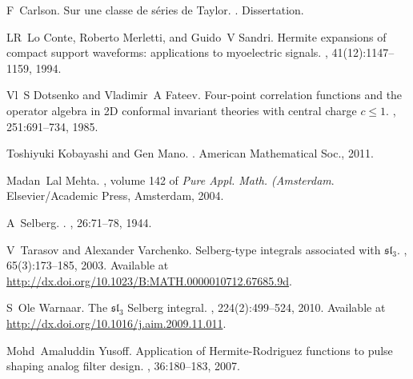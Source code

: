 	
	\nocite{Selberg:411367}
	\nocite{warnaar2010sl3}
	\nocite{dotsenko1985four}
	\nocite{tarasov2003selberg}

\begin{thebibliography}{CMS94}

F~Carlson.
\newblock Sur une classe de s\'eries de {T}aylor.
.
\newblock Dissertation.

LR~Lo Conte, Roberto Merletti, and Guido~V Sandri.
\newblock Hermite expansions of compact support waveforms: applications to
  myoelectric signals.
, 41(12):1147--1159,
  1994.

Vl~S Dotsenko and Vladimir~A Fateev.
\newblock Four-point correlation functions and the operator algebra in 2{D}
  conformal invariant theories with central charge $c\leq 1$.
, 251:691--734, 1985.

Toshiyuki Kobayashi and Gen Mano.
.
\newblock American Mathematical Soc., 2011.

Madan~Lal Mehta.
, volume 142 of {\em {\normalfont Pure Appl.
  Math. ({A}msterdam}}.
\newblock Elsevier/{A}cademic {P}ress, {A}msterdam, 2004.

A~Selberg.
.
, 26:71--78, 1944.

V~Tarasov and Alexander Varchenko.
\newblock Selberg-type integrals associated with $\mathfrak{sl}_3$.
, 65(3):173--185, 2003.
\newblock Available at
  \url{http://dx.doi.org/10.1023/B:MATH.0000010712.67685.9d}.

S~Ole Warnaar.
\newblock The $\mathfrak{sl}_3$ {S}elberg integral.
, 224(2):499--524, 2010.
\newblock Available at \url{http://dx.doi.org/10.1016/j.aim.2009.11.011}.

Mohd~Amaluddin Yusoff.
\newblock Application of {H}ermite-{R}odriguez functions to pulse shaping
  analog filter design.
,
  36:180--183, 2007.

\end{thebibliography}

